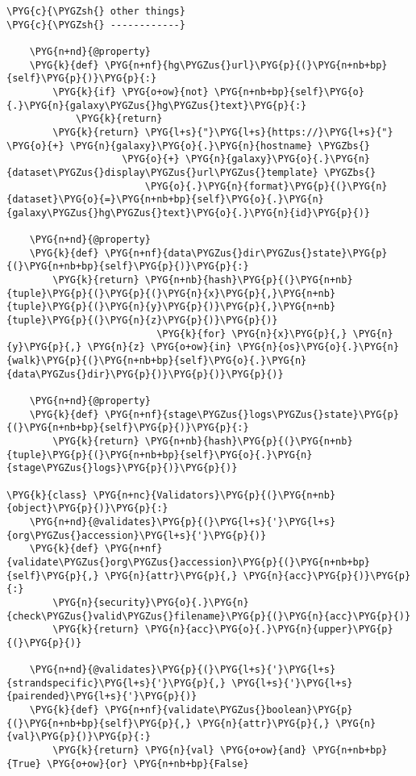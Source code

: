 \begin{Verbatim}[commandchars=\\\{\}]
\PYG{c}{\PYGZsh{} other things}
\PYG{c}{\PYGZsh{} ------------}

    \PYG{n+nd}{@property}
    \PYG{k}{def} \PYG{n+nf}{hg\PYGZus{}url}\PYG{p}{(}\PYG{n+nb+bp}{self}\PYG{p}{)}\PYG{p}{:}
        \PYG{k}{if} \PYG{o+ow}{not} \PYG{n+nb+bp}{self}\PYG{o}{.}\PYG{n}{galaxy\PYGZus{}hg\PYGZus{}text}\PYG{p}{:}
            \PYG{k}{return}
        \PYG{k}{return} \PYG{l+s}{"}\PYG{l+s}{https://}\PYG{l+s}{"} \PYG{o}{+} \PYG{n}{galaxy}\PYG{o}{.}\PYG{n}{hostname} \PYGZbs{}
                    \PYG{o}{+} \PYG{n}{galaxy}\PYG{o}{.}\PYG{n}{dataset\PYGZus{}display\PYGZus{}url\PYGZus{}template} \PYGZbs{}
                        \PYG{o}{.}\PYG{n}{format}\PYG{p}{(}\PYG{n}{dataset}\PYG{o}{=}\PYG{n+nb+bp}{self}\PYG{o}{.}\PYG{n}{galaxy\PYGZus{}hg\PYGZus{}text}\PYG{o}{.}\PYG{n}{id}\PYG{p}{)}

    \PYG{n+nd}{@property}
    \PYG{k}{def} \PYG{n+nf}{data\PYGZus{}dir\PYGZus{}state}\PYG{p}{(}\PYG{n+nb+bp}{self}\PYG{p}{)}\PYG{p}{:}
        \PYG{k}{return} \PYG{n+nb}{hash}\PYG{p}{(}\PYG{n+nb}{tuple}\PYG{p}{(}\PYG{p}{(}\PYG{n}{x}\PYG{p}{,}\PYG{n+nb}{tuple}\PYG{p}{(}\PYG{n}{y}\PYG{p}{)}\PYG{p}{,}\PYG{n+nb}{tuple}\PYG{p}{(}\PYG{n}{z}\PYG{p}{)}\PYG{p}{)}
                          \PYG{k}{for} \PYG{n}{x}\PYG{p}{,} \PYG{n}{y}\PYG{p}{,} \PYG{n}{z} \PYG{o+ow}{in} \PYG{n}{os}\PYG{o}{.}\PYG{n}{walk}\PYG{p}{(}\PYG{n+nb+bp}{self}\PYG{o}{.}\PYG{n}{data\PYGZus{}dir}\PYG{p}{)}\PYG{p}{)}\PYG{p}{)}

    \PYG{n+nd}{@property}
    \PYG{k}{def} \PYG{n+nf}{stage\PYGZus{}logs\PYGZus{}state}\PYG{p}{(}\PYG{n+nb+bp}{self}\PYG{p}{)}\PYG{p}{:}
        \PYG{k}{return} \PYG{n+nb}{hash}\PYG{p}{(}\PYG{n+nb}{tuple}\PYG{p}{(}\PYG{n+nb+bp}{self}\PYG{o}{.}\PYG{n}{stage\PYGZus{}logs}\PYG{p}{)}\PYG{p}{)}

\PYG{k}{class} \PYG{n+nc}{Validators}\PYG{p}{(}\PYG{n+nb}{object}\PYG{p}{)}\PYG{p}{:}
    \PYG{n+nd}{@validates}\PYG{p}{(}\PYG{l+s}{'}\PYG{l+s}{org\PYGZus{}accession}\PYG{l+s}{'}\PYG{p}{)}
    \PYG{k}{def} \PYG{n+nf}{validate\PYGZus{}org\PYGZus{}accession}\PYG{p}{(}\PYG{n+nb+bp}{self}\PYG{p}{,} \PYG{n}{attr}\PYG{p}{,} \PYG{n}{acc}\PYG{p}{)}\PYG{p}{:}
        \PYG{n}{security}\PYG{o}{.}\PYG{n}{check\PYGZus{}valid\PYGZus{}filename}\PYG{p}{(}\PYG{n}{acc}\PYG{p}{)}
        \PYG{k}{return} \PYG{n}{acc}\PYG{o}{.}\PYG{n}{upper}\PYG{p}{(}\PYG{p}{)}

    \PYG{n+nd}{@validates}\PYG{p}{(}\PYG{l+s}{'}\PYG{l+s}{strandspecific}\PYG{l+s}{'}\PYG{p}{,} \PYG{l+s}{'}\PYG{l+s}{pairended}\PYG{l+s}{'}\PYG{p}{)}
    \PYG{k}{def} \PYG{n+nf}{validate\PYGZus{}boolean}\PYG{p}{(}\PYG{n+nb+bp}{self}\PYG{p}{,} \PYG{n}{attr}\PYG{p}{,} \PYG{n}{val}\PYG{p}{)}\PYG{p}{:}
        \PYG{k}{return} \PYG{n}{val} \PYG{o+ow}{and} \PYG{n+nb+bp}{True} \PYG{o+ow}{or} \PYG{n+nb+bp}{False}


\end{Verbatim}
